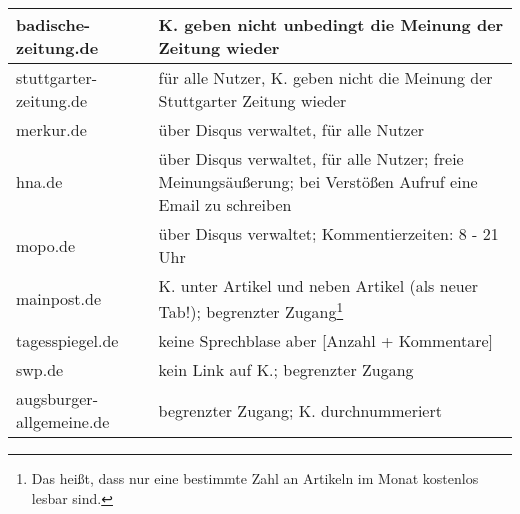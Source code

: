 \begin{longtable}{lp{10cm}}
badische-zeitung.de & K. geben nicht unbedingt die Meinung der Zeitung wieder
  \\\midrule

stuttgarter-zeitung.de &
  für alle Nutzer, K. geben nicht die Meinung der Stuttgarter Zeitung
  wieder\\\midrule

merkur.de &
  über Disqus verwaltet, für alle Nutzer\\\midrule

hna.de &
  über Disqus verwaltet, für alle Nutzer; freie Meinungsäußerung; bei Verstößen
  Aufruf eine Email zu schreiben \\\midrule

mopo.de &
  über Disqus verwaltet; Kommentierzeiten: 8 - 21 Uhr\\\midrule

mainpost.de &
  K. unter Artikel und neben Artikel (als neuer Tab!); begrenzter
  Zugang\footnote{Das heißt, dass nur eine bestimmte Zahl an Artikeln im Monat
  kostenlos lesbar sind.}\\\midrule

tagesspiegel.de &
  keine Sprechblase aber [Anzahl + Kommentare]\\\midrule

swp.de &
  kein Link auf K.; begrenzter Zugang\\\midrule

augsburger-allgemeine.de &
  begrenzter Zugang; K. durchnummeriert
\end{longtable}
\endgroup

